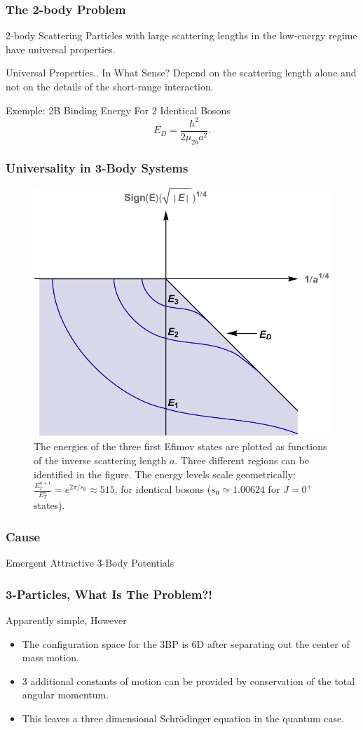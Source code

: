 \documentclass{beamer}
\begin{document}
\begin{frame}
\frametitle{The 2-body Problem}
\begin{block}{2-body Scattering}
	Particles with large scattering lengths in the low-energy regime have universal properties. 
\end{block}

\begin{block}{Universal Properties.. In What Sense?}
	Depend on the scattering length alone and not on the details of the short-range interaction.
\end{block}

\begin{block}{Exemple: 2B Binding Energy For 2 Identical Bosons}
	\begin{equation}
	E_D = \frac{\hbar^2}{2 \mu_{2b} a^2}.
	\end{equation}
\end{block}
\end{frame}

\begin{frame}
\frametitle{Universality in 3-Body Systems}
\begin{figure}
	\centering
	\includegraphics[width=0.5\linewidth]{efimov}
	\caption{The energies of the three first Efimov states are plotted as functions of the inverse scattering length $a$. Three different regions can be identified in the figure.	The energy levels scale geometrically: $\frac{E_T^{n+1}}{E_T^{n}} = e^{2\pi/s_0} \approx 515$, for identical bosons ($s_0 \simeq 1.00624$ for $J=0^+$ states).}
\end{figure} 
\end{frame}

\begin{frame}
\frametitle{Cause}
\centerline{Emergent Attractive 3-Body Potentials}
\end{frame}

\begin{frame}
\frametitle{3-Particles, What Is The Problem?!}
\begin{block}{Apparently simple, However}
	\begin{itemize}
	\item The configuration space for the 3BP is 6D after separating out the center of mass motion.
	\item 3 additional constants of motion can be provided by conservation of the total angular momentum.
	\item This leaves a three dimensional Schr{\"o}dinger equation in the quantum case.
	\end{itemize}
\end{block}
\end{frame}
\end{document}
